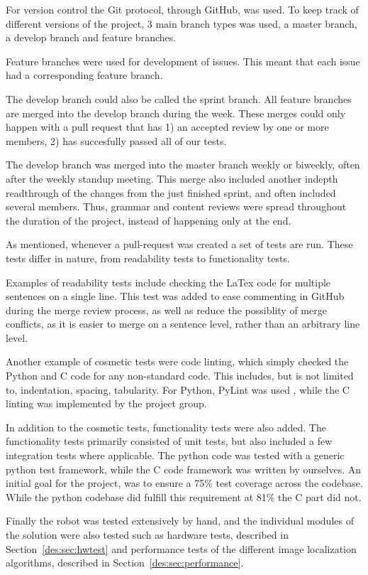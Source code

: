 For version control the Git protocol, through GitHub, was used.
To keep track of different versions of the project, 3 main branch types was used, a master branch, a develop branch and feature branches.

Feature branches were used for development of issues.
This meant that each issue had a corresponding feature branch.

The develop branch could also be called the sprint branch.
All feature branches are merged into the develop branch during the week.
These merges could only happen with a pull request that has 1) an accepted review by one or more members, 2) has succesfully passed all of our tests.

The develop branch was merged into the master branch weekly or biweekly, often after the weekly standup meeting.
This merge also included another indepth readthrough of the changes from the just finished sprint, and often included several members.
Thus, grammar and content reviews were spread throughout the duration of the project, instead of happening only at the end.

As mentioned, whenever a pull-request was created a set of tests are run.
These tests differ in nature, from readability tests to functionality tests.

Examples of readability tests include checking the LaTex code for multiple sentences on a single line.
This test was added to ease commenting in GitHub during the merge review process, as well as reduce the possiblity of merge conflicts, as it is easier to merge on a sentence level, rather than an arbitrary line level.

Another example of cosmetic tests were code linting, which simply checked the Python and C code for any non-standard code.
This includes, but is not limited to, indentation, spacing, tabularity.
For Python, PyLint was used , while the C linting was implemented by the project group.

In addition to the cosmetic tests, functionality tests were also added.
The functionality tests primarily consisted of unit tests, but also included a few integration tests where applicable.
The python code was tested with  a generic python test framework, while the C code framework was written by ourselves.
An initial goal for the project, was to ensure a 75\% test coverage across the codebase.
While the python codebase did fulfill this requirement at 81\% the C part did not.

Finally the robot was tested extensively by hand, and the individual modules of the solution were also tested such as hardware tests, described in Section~\ref{des:sec:hwtest} and performance tests of the different image localization algorithms, described in Section~\ref{des:sec:performance}.
